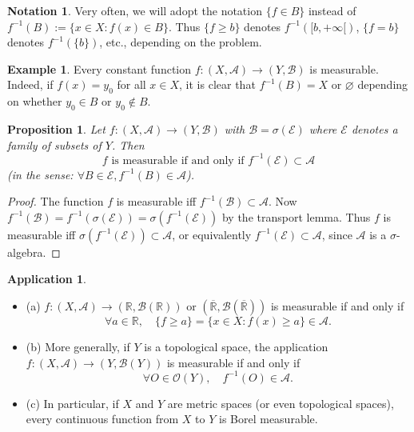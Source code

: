 \documentclass[11pt]{article}
\newtheorem{proposition}{Proposition}[section]
\theoremstyle{definition}
\newtheorem{example}{Example}[section]
\newtheorem{application}{Application}[section]
\newtheorem{notation}{Notation}[section]
\begin{document}
\begin{notation}
	Very often, we will adopt the notation $\{f\in B\}$ instead of $f^{-1}(B):=\{x\in X: f(x)\in B\}$. Thus $\{f\geq b\}$ denotes $f^{-1}([b,+\infty[)$, $\{f=b\}$ denotes $f^{-1}(\{b\})$, etc., depending on the problem.
\end{notation}

\begin{example}
	Every constant function $f:(X,\mathscr{A})\to (Y,\mathscr{B})$ is measurable. Indeed, if $f(x)=y_0$ for all $x\in X$, it is clear that $f^{-1}(B)=X$ or $\varnothing$ depending on whether $y_0\in B$ or $y_0\notin B$.
\end{example}

\begin{proposition}
Let $f:(X,\mathscr{A})\to (Y,\mathscr{B})$ with $\mathscr{B}=\sigma(\mathscr{E})$ where $\mathscr{E}$ denotes a family of subsets of $Y$. Then
\[
f \text{ is measurable if and only if } f^{-1}(\mathscr{E})\subset \mathscr{A}
\]
(in the sense: $\forall B\in \mathscr{E}, f^{-1}(B)\in\mathscr{A}$).
\end{proposition}

\begin{proof}
The function $f$ is measurable iff $f^{-1}(\mathscr{B})\subset \mathscr{A}$. Now $f^{-1}(\mathscr{B})=f^{-1}(\sigma(\mathscr{E}))=\sigma(f^{-1}(\mathscr{E}))$ by the transport lemma. Thus $f$ is measurable iff $\sigma(f^{-1}(\mathscr{E}))\subset \mathscr{A}$, or equivalently $f^{-1}(\mathscr{E})\subset \mathscr{A}$, since $\mathscr{A}$ is a $\sigma$-algebra.
\end{proof}

\begin{application}
\begin{itemize}
\item (a) $f:(X,\mathscr{A})\to (\mathbb{R},\mathscr{B}(\mathbb{R}))$ or $(\overline{\mathbb{R}},\mathscr{B}(\overline{\mathbb{R}}))$ is measurable if and only if
\[
\forall a\in \mathbb{R}, \quad \{f\geq a\}=\{x\in X: f(x)\geq a\}\in\mathscr{A}.
\]

\item (b) More generally, if $Y$ is a topological space, the application $f:(X,\mathscr{A})\to (Y,\mathscr{B}(Y))$ is measurable if and only if
\[
\forall O\in \mathscr{O}(Y), \quad f^{-1}(O)\in \mathscr{A}.
\]

\item (c) In particular, if $X$ and $Y$ are metric spaces (or even topological spaces), every continuous function from $X$ to $Y$ is Borel measurable.
\end{itemize}
\end{application}
\end{document}
